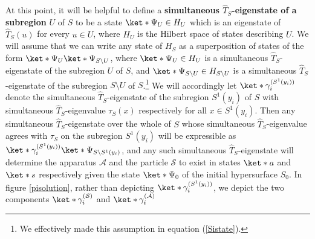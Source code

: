 \documentclass[12pt]{report}
\providecommand{\DIFaddbegin}{} %
\providecommand{\DIFaddend}{} %
\providecommand{\DIFdelbegin}{} %
\providecommand{\DIFdelend}{} %
\begin{document}
At this point, it will be helpful to define a \textbf{simultaneous $\hat{T}_S$-eigenstate of a subregion} $U$ of $S$ to be a state $\ket*{\Psi_U}\in H_U$  %
%
 which is an eigenstate of $\hat{T}_S(u)$ for every $u\in U$, where $H_U$ is the Hilbert space of states describing $U$. We will assume that we can write any state of $H_S$ as a superposition of states of the form $\ket*{\Psi_U}\ket*{\Psi_{S\setminus U}}$,%
  where $\ket*{\Psi_U}\in H_U $ is  a simultaneous $\hat{T}_S$-eigenstate of the subregion $U$ of $S$, and $\ket*{\Psi_{S\setminus U}}\in H_{S\setminus U}$ is a simultaneous
$\hat{T}_S$-eigenstate of the subregion $S\setminus U$ of $S$.\footnote{We effectively made this assumption in equation (\ref{Sistate}).} We will accordingly let  
$\ket*{\gamma^{(S^1(y_i))}_i}$ %
\DIFdelbegin %
\DIFdelend \DIFaddbegin {}\DIFaddend %
 denote the simultaneous $\hat{T}_S$-eigenstate of the subregion $S^1(y_i)$ of $S$ with simultaneous $\hat{T}_S$-eigenvalue $\tau_S(x)$ respectively for all $x\in S^1(y_i)$. Then any  simultaneous $\hat{T}_S$-eigenstate over the whole of $S$  whose simultaneous $\hat{T}_S$-eigenvalue agrees with 
$\tau_S$ on the subregion $S^1(y_i)$ will be expressible as
$\ket*{\gamma^{(S^1(y_i))}_i}\ket*{\Psi_{S\setminus S^1(y_i)}}$, 
and any such simultaneous $\hat{T}_S$-eigenstate will determine the apparatus $\mathcal{A}$ and the particle $\mathcal{S}$ to exist in states $\ket*{a}$ and $\ket*{s}$ respectively given the state $\ket*{\Psi_0}$ of the initial hypersurface $S_0$. In figure \ref{pisolution}, rather than depicting $\ket*{\gamma^{(S^1(y_i))}_i}$, we depict the two components $\ket*{\gamma^{(\mathcal{S})}_i}$ and $\ket*{\gamma^{(\mathcal{A})}_i}$ %
%
\end{document}
